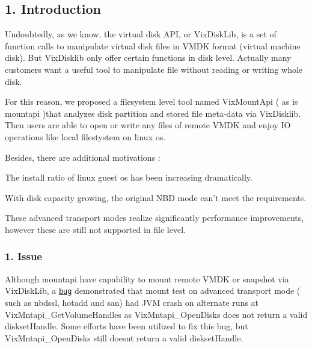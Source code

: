 

 \subsection*{1. Introduction}

Undoubtedly, as we know, the virtual disk A\+PI, or Vix\+Disk\+Lib, is a set of function calls to manipulate virtual disk files in V\+M\+DK format (virtual machine disk). But Vix\+Disklib only offer certain functions in disk level. Actually many customers want a useful tool to manipulate file without reading or writing whole disk.

For this reason, we proposed a filesystem level tool named Vix\+Mount\+Api ( as is mountapi )that analyzes disk partition and stored file meta-\/data via Vix\+Disklib. Then users are able to open or write any files of remote V\+M\+DK and enjoy IO operations like local filestystem on linux os.

Besides, there are additional motivations \+:


\begin{DoxyEnumerate}
\item The install ratio of linux guest os has been increasing dramatically.
\end{DoxyEnumerate}
\begin{DoxyItemize}
\item With disk capacity growing, the original N\+BD mode can’t meet the requirements.
\item These advanced transport modes realize significantly performance improvements, however these are still not supported in file level. 


\end{DoxyItemize}

\subsubsection*{1. Issue}

Although mountapi have capability to mount remote V\+M\+DK or snapshot via Vix\+Disk\+Lib, a \href{https://bugzilla.eng.vmware.com/show_bug.cgi?id=1492312}{\tt bug} demonstrated that mount test on advanced transport mode ( such as nbdssl, hotadd and san) had J\+VM crash on alternate runs at Vix\+Mntapi\+\_\+\+Get\+Volume\+Handles as Vix\+Mntapi\+\_\+\+Open\+Disks does not return a valid diskset\+Handle. Some efforts have been utilized to fix this bug, but Vix\+Mntapi\+\_\+\+Open\+Disks still doesn\textquotesingle{}t return a valid diskset\+Handle.

